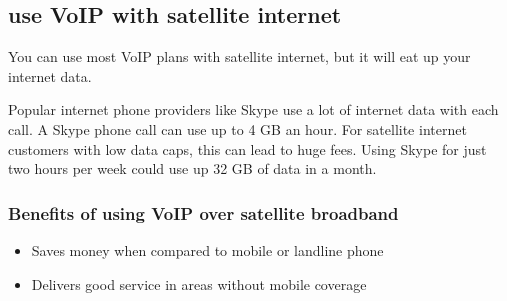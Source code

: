 \documentclass[a4paper,12pt]{book}
\begin{document}


\subsection{use VoIP with satellite internet}
You can use most VoIP plans with satellite internet, but it will eat up your internet data. 

\noindent Popular internet phone providers like Skype use a lot of internet data with each call.  A Skype phone call can use up to 4 GB an hour. For satellite internet customers with low data caps, this can lead to huge fees. Using Skype for just two hours per week could use up 32 GB of data in a month.

\subsubsection{Benefits of using VoIP over satellite broadband}
\begin{itemize}
\item{Saves money when compared to mobile or landline phone}
\item{Delivers good service in areas without mobile coverage}
\end{itemize}
\end{document}
